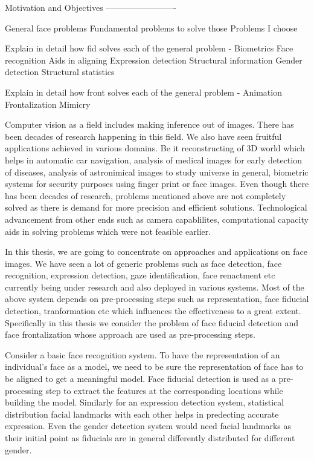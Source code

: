 Motivation and Objectives
-------------------------

General face problems
Fundamental problems to solve those
Problems I choose

Explain in detail how fid solves each of the general problem
- Biometrics
    Face recognition
        Aids in aligning
    Expression detection
        Structural information
    Gender detection
        Structural statistics

Explain in detail how front solves each of the general problem
- Animation
    Frontalization
    Mimicry
    
Computer vision as a field includes making inference out of images. There has been decades of research 
happening in this field. We also have seen fruitful applications achieved in various domains. Be it 
reconstructing of 3D world which helps in automatic car navigation, analysis of medical images for 
early detection of diseases, analysis of astronimical images to study universe in general, biometric
systems for security purposes using finger print or face images. Even though there has been decades of 
research, problems mentioned above are not completely solved as there is demand for more precision
and efficient solutions. Technological advancement from other ends such as camera capablilites,
computational capacity aids in solving problems which were not feasible earlier.

In this thesis, we are going to concentrate on approaches and applications on face images. We have seen
a lot of generic problems such as face detection, face recognition, expression detection, gaze
identification, face renactment etc currently being under research and also deployed in various 
systems. Most of the above system depends on pre-processing steps such as representation, face fiducial 
detection, tranformation etc which influences the effectiveness to a great extent. Specifically in this
thesis we consider the problem of face fiducial detection and face frontalization whose approach are 
used as pre-processing steps.

Consider a basic face recognition system. To have the representation of an individual's face as a 
model, we need to be sure the representation of face has to be aligned to get a meaningful model. 
Face fiducial detection is used as a pre-processing step to extract the features at the corresponding
locations while building the model. Similarly for an expression detection system, statistical 
distribution facial landmarks with each other helps in predecting accurate expression. Even the 
gender detection system would need facial landmarks as their initial point as fiducials are in
general differently distributed for different gender.

